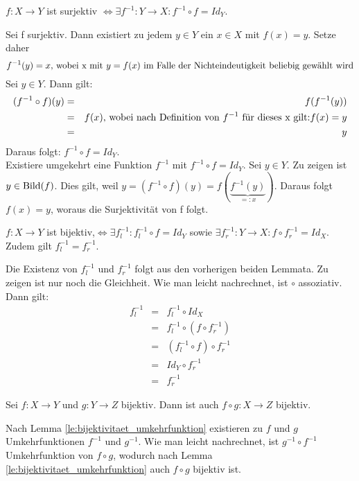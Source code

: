 \documentclass[10pt]{scrbook}
\begin{document}
\begin{Le}
$f: X\rightarrow Y$ ist surjektiv $\Leftrightarrow \exists f^{-1}: Y \rightarrow X: f^{-1}\circ f=Id_Y$.
\end{Le}
\begin{bew}
Sei f surjektiv. Dann existiert zu jedem $y\in Y$ ein $x\in X$ mit $f(x)=y$. Setze daher
\begin{displaymath}
f^{-1}(y)=x\textnormal{, wobei x mit }y=f(x)\textnormal{ im Falle der Nichteindeutigkeit beliebig gewählt wird}
\end{displaymath}
Sei $y\in Y$. Dann gilt:
\begin{eqnarray*}
(f^{-1}\circ f)(y) & = & f(f^{-1}(y)) \\
& = & f(x)\textnormal{, wobei nach Definition von }f^{-1}\textnormal{ für dieses x gilt:}f(x)=y\\
& = & y
\end{eqnarray*}
Daraus folgt: $f^{-1}\circ f=Id_Y$.\\

Existiere umgekehrt eine Funktion $f^{-1}$ mit $f^{-1}\circ f=Id_Y$. Sei $y\in Y$. Zu zeigen ist $y\in\operatorname{Bild}(f)$.
Dies gilt, weil $y=(f^{-1}\circ f)(y)=f(\underbrace{f^{-1}(y)}_{=:x})$. Daraus folgt $f(x)=y$, woraus die Surjektivität von f folgt.
\end{bew}

\begin{Le}\label{le:bijektivitaet_umkehrfunktion}
$f: X\rightarrow Y$ ist bijektiv,$\Leftrightarrow \exists f_l^{-1}: f_l^{-1}\circ f=Id_Y$ sowie $\exists f_r^{-1}: Y \rightarrow X: f\circ f_r^{-1}=Id_X$. Zudem gilt $f_l^{-1}=f_r^{-1}$.
\end{Le}
\begin{bew}
Die Existenz von $f_l^{-1}$ und $f_r^{-1}$ folgt aus den vorherigen beiden Lemmata. Zu zeigen ist nur noch die Gleichheit. Wie man leicht nachrechnet, ist $\circ$ assoziativ. Dann gilt:
\begin{eqnarray*}
	f_l^{-1} & = & f_l^{-1}\circ Id_X \\
	& = & f_l^{-1} \circ (f\circ f_r^{-1}) \\
	& = & (f_l^{-1} \circ f)\circ f_r^{-1} \\
	& = & Id_Y\circ f_r^{-1} \\
	& = & f_r^{-1}
\end{eqnarray*}
\end{bew}

\begin{Le}
Sei $f: X\rightarrow Y$ und $g: Y\rightarrow Z$ bijektiv. Dann ist auch $f\circ g: X\rightarrow Z$ bijektiv.
\end{Le}
\begin{bew}
Nach Lemma \ref{le:bijektivitaet_umkehrfunktion} existieren zu $f$ und $g$ Umkehrfunktionen $f^{-1}$ und $g^{-1}$. Wie man leicht nachrechnet, ist $g^{-1}\circ f^{-1}$ Umkehrfunktion von $f\circ g$, wodurch nach Lemma \ref{le:bijektivitaet_umkehrfunktion} auch $f\circ g$ bijektiv ist.
\end{bew}
\end{document}
